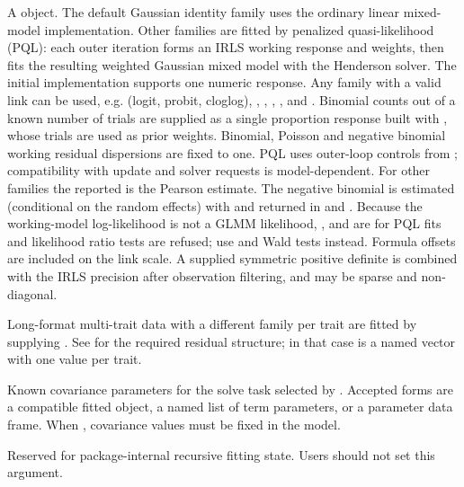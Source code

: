 \documentclass[a4paper]{book}
\begin{document}
\begin{Arguments}
\begin{ldescription}
\item[\code{family}] A  object. The default Gaussian identity
family uses the ordinary linear mixed-model implementation. Other families are
fitted by penalized quasi-likelihood (PQL): each outer iteration forms an IRLS
working response and weights, then fits the resulting weighted Gaussian mixed
model with the Henderson solver. The initial implementation supports one numeric
response. Any family with a valid link can be used, e.g. 
(logit, probit, cloglog), , ,
, , 
and . Binomial counts out of a known
number of trials are supplied as a single proportion response built with
, whose trials are used as prior weights. Binomial,
Poisson and negative binomial working residual dispersions are fixed to one.
PQL uses outer-loop controls from ; compatibility with
update and solver requests is model-dependent.
For other families the reported  is the Pearson estimate.
The negative binomial \eqn{\theta}{} is estimated (conditional on the random
effects) with  and returned in
 and . Because the working-model
log-likelihood is not a GLMM likelihood, ,  and
 are  for PQL fits and  likelihood ratio
tests are refused; use  and Wald tests instead.
Formula offsets are included on the link scale. A supplied symmetric positive
definite  is combined with the IRLS precision after observation filtering,
and may be sparse and non-diagonal.

Long-format multi-trait data with a different family per trait are fitted by
supplying . See  for the required residual
structure; in that case  is a named vector with one value
per trait.

\item[\code{covPar}] Known covariance parameters for the solve task selected by
. Accepted forms are a compatible fitted
 object, a named list of term parameters, or a parameter data
frame. When , covariance values must be fixed in the model.

\item[\code{.internal}] Reserved for package-internal recursive fitting state.
Users should not set this argument.
\end{ldescription}
\end{Arguments}
\end{document}
